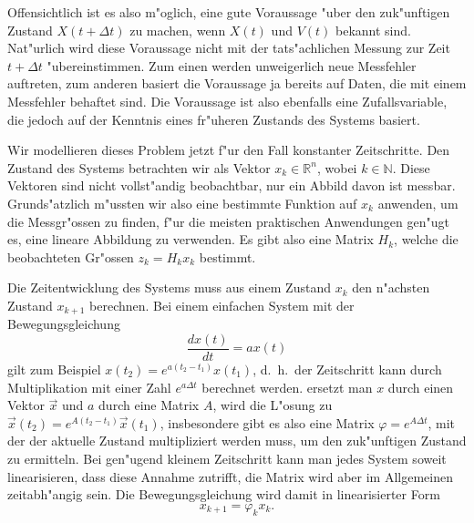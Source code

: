 Offensichtlich ist es also m"oglich, eine gute Voraussage "uber den
zuk"unftigen Zustand $X(t+\Delta t)$ zu machen, wenn $X(t)$ und $V(t)$
bekannt sind.
Nat"urlich wird diese Voraussage nicht mit der tats"achlichen
Messung zur Zeit $t+\Delta t$ "ubereinstimmen.
Zum einen werden unweigerlich
neue Messfehler auftreten, zum anderen basiert die Voraussage ja bereits
auf Daten, die mit einem Messfehler behaftet sind.
Die Voraussage ist also
ebenfalls eine Zufallsvariable, die jedoch auf der Kenntnis eines fr"uheren
Zustands des Systems basiert.

Wir modellieren dieses Problem jetzt f"ur den Fall konstanter Zeitschritte.
Den Zustand des Systems betrachten wir als Vektor $x_k\in\mathbb{R}^n$,
wobei $k\in\mathbb{N}$.
Diese Vektoren sind nicht vollst"andig beobachtbar,
nur ein Abbild davon ist messbar.
Grunds"atzlich m"ussten wir also eine
bestimmte Funktion auf $x_k$ anwenden, um die Messgr"ossen zu finden,
f"ur die meisten praktischen Anwendungen gen"ugt es, eine lineare Abbildung
zu verwenden.
Es gibt also eine Matrix $H_k$, welche die beobachteten
Gr"ossen $z_k=H_kx_k$ bestimmt.

Die Zeitentwicklung des Systems muss aus einem Zustand $x_k$ den n"achsten
Zustand $x_{k+1}$ berechnen.
Bei einem
einfachen System mit der Bewegungsgleichung
\[
\frac{dx(t)}{dt}=ax(t)
\]
gilt zum Beispiel $x(t_2)=e^{a(t_2-t_1)}x(t_1)$, d.~h.~der Zeitschritt
kann durch Multiplikation mit einer Zahl $e^{a\Delta t}$ berechnet werden.
ersetzt man $x$ durch einen Vektor $\vec x$ und $a$ durch eine Matrix
$A$, wird die L"osung zu $\vec x(t_2)=e^{A(t_2-t_1)}\vec x(t_1)$,
insbesondere gibt es also eine Matrix $\varphi=e^{A\Delta t}$, mit
der der aktuelle Zustand multipliziert werden muss, um den zuk"unftigen
Zustand zu ermitteln.
Bei gen"ugend kleinem Zeitschritt kann man jedes
System soweit linearisieren, dass diese Annahme zutrifft, die Matrix
wird aber im Allgemeinen zeitabh"angig sein.
Die Bewegungsgleichung
wird damit in linearisierter Form
\[
x_{k+1}=\varphi_kx_k.
\]

